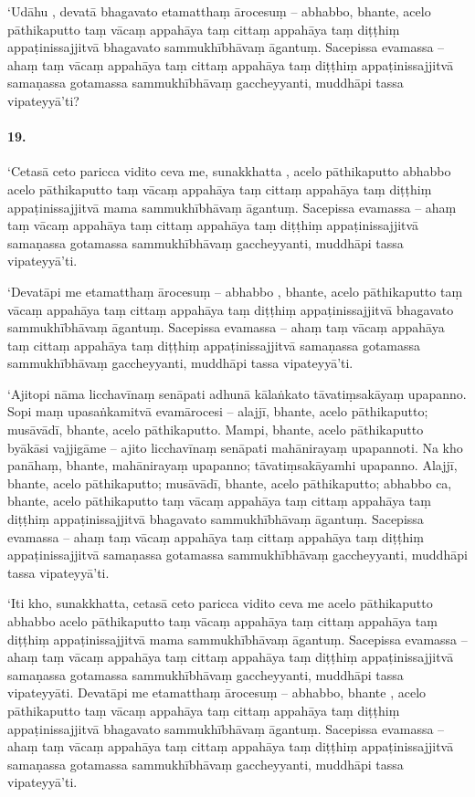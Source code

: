 ‘Udāhu , devatā bhagavato etamatthaṃ ārocesuṃ – abhabbo, bhante, acelo pāthikaputto taṃ vācaṃ appahāya taṃ cittaṃ appahāya taṃ diṭṭhiṃ appaṭinissajjitvā bhagavato sammukhībhāvaṃ āgantuṃ. Sacepissa evamassa – ahaṃ taṃ vācaṃ appahāya taṃ cittaṃ appahāya taṃ diṭṭhiṃ appaṭinissajjitvā samaṇassa gotamassa sammukhībhāvaṃ gaccheyyanti, muddhāpi tassa vipateyyā’ti?

\paragraph{19.} ‘Cetasā ceto paricca vidito ceva me, sunakkhatta , acelo pāthikaputto abhabbo acelo pāthikaputto taṃ vācaṃ appahāya taṃ cittaṃ appahāya taṃ diṭṭhiṃ appaṭinissajjitvā mama sammukhībhāvaṃ āgantuṃ. Sacepissa evamassa – ahaṃ taṃ vācaṃ appahāya taṃ cittaṃ appahāya taṃ diṭṭhiṃ appaṭinissajjitvā samaṇassa gotamassa sammukhībhāvaṃ gaccheyyanti, muddhāpi tassa vipateyyā’ti.

‘Devatāpi me etamatthaṃ ārocesuṃ – abhabbo , bhante, acelo pāthikaputto taṃ vācaṃ appahāya taṃ cittaṃ appahāya taṃ diṭṭhiṃ appaṭinissajjitvā bhagavato sammukhībhāvaṃ āgantuṃ. Sacepissa evamassa – ahaṃ taṃ vācaṃ appahāya taṃ cittaṃ appahāya taṃ diṭṭhiṃ appaṭinissajjitvā samaṇassa gotamassa sammukhībhāvaṃ gaccheyyanti, muddhāpi tassa vipateyyā’ti.

‘Ajitopi nāma licchavīnaṃ senāpati adhunā kālaṅkato tāvatiṃsakāyaṃ upapanno. Sopi maṃ upasaṅkamitvā evamārocesi – alajjī, bhante, acelo pāthikaputto; musāvādī, bhante, acelo pāthikaputto. Mampi, bhante, acelo pāthikaputto byākāsi vajjigāme – ajito licchavīnaṃ senāpati mahānirayaṃ upapannoti. Na kho panāhaṃ, bhante, mahānirayaṃ upapanno; tāvatiṃsakāyamhi upapanno. Alajjī, bhante, acelo pāthikaputto; musāvādī, bhante, acelo pāthikaputto; abhabbo ca, bhante, acelo pāthikaputto taṃ vācaṃ appahāya taṃ cittaṃ appahāya taṃ diṭṭhiṃ appaṭinissajjitvā bhagavato sammukhībhāvaṃ āgantuṃ. Sacepissa evamassa – ahaṃ taṃ vācaṃ appahāya taṃ cittaṃ appahāya taṃ diṭṭhiṃ appaṭinissajjitvā samaṇassa gotamassa sammukhībhāvaṃ gaccheyyanti, muddhāpi tassa vipateyyā’ti.

‘Iti kho, sunakkhatta, cetasā ceto paricca vidito ceva me acelo pāthikaputto abhabbo acelo pāthikaputto taṃ vācaṃ appahāya taṃ cittaṃ appahāya taṃ diṭṭhiṃ appaṭinissajjitvā mama sammukhībhāvaṃ āgantuṃ. Sacepissa evamassa – ahaṃ taṃ vācaṃ appahāya taṃ cittaṃ appahāya taṃ diṭṭhiṃ appaṭinissajjitvā samaṇassa gotamassa sammukhībhāvaṃ gaccheyyanti, muddhāpi tassa vipateyyāti. Devatāpi me etamatthaṃ ārocesuṃ – abhabbo, bhante , acelo pāthikaputto taṃ vācaṃ appahāya taṃ cittaṃ appahāya taṃ diṭṭhiṃ appaṭinissajjitvā bhagavato sammukhībhāvaṃ āgantuṃ. Sacepissa evamassa – ahaṃ taṃ vācaṃ appahāya taṃ cittaṃ appahāya taṃ diṭṭhiṃ appaṭinissajjitvā samaṇassa gotamassa sammukhībhāvaṃ gaccheyyanti, muddhāpi tassa vipateyyā’ti.

